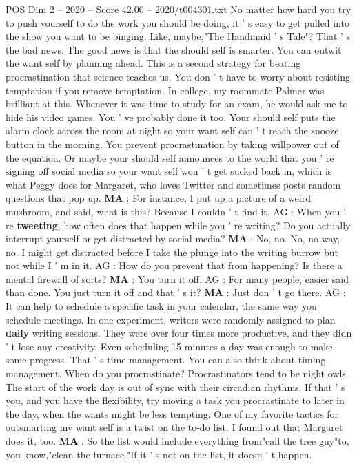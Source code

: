 \begin{textsample}{POS Dim 2 – 2020 – Score 42.00 – 2020/t004301.txt}
No matter how hard you try to push yourself to do the work you should be doing, it ' s easy to get pulled into the show you want to be binging.
Like, maybe,"The Handmaid ' s Tale"?
That ' s the bad news.
The good news is that the should self is smarter.
You can outwit the want self by planning ahead.
This is a second strategy for beating procrastination that science teaches us.
You don ' t have to worry about resisting temptation if you remove temptation.
In college, my roommate Palmer was brilliant at this.
Whenever it was time to study for an exam, he would ask me to hide his video games.
You ' ve probably done it too.
Your should self puts the alarm clock across the room at night so your want self can ' t reach the snooze button in the morning.
You prevent procrastination by taking willpower out of the equation.
Or maybe your should self announces to the world that you ' re signing off social media so your want self won ' t get sucked back in, which is what Peggy does for Margaret, who loves Twitter and sometimes posts random questions that pop up. \textbf{MA} : For instance, I put up a picture of a weird mushroom, and said, what is this?
Because I couldn ' t find it.
AG : When you ' re \textbf{tweeting}, how often does that happen while you ' re writing?
Do you actually interrupt yourself or get distracted by social media? \textbf{MA} : No, no.
No, no way, no.
I might get distracted before I take the plunge into the writing burrow but not while I ' m in it.
AG : How do you prevent that from happening?
Is there a mental firewall of sorts? \textbf{MA} : You turn it off.
AG : For many people, easier said than done.
You just turn it off and that ' s it? \textbf{MA} : Just don ' t go there.
AG : It can help to schedule a specific task in your calendar, the same way you schedule meetings.
In one experiment, writers were randomly assigned to plan \textbf{daily} writing sessions.
They were over four times more productive, and they didn ' t lose any creativity.
Even scheduling 15 minutes a day was enough to make some progress.
That ' s time management.
You can also think about timing management.
When do you procrastinate?
Procrastinators tend to be night owls.
The start of the work day is out of sync with their circadian rhythms.
If that ' s you, and you have the flexibility, try moving a task you procrastinate to later in the day, when the wants might be less tempting.
One of my favorite tactics for outsmarting my want self is a twist on the to-do list.
I found out that Margaret does it, too. \textbf{MA} : So the list would include everything from"call the tree guy"to, you know,"clean the furnace."If it ' s not on the list, it doesn ' t happen.

\end{textsample}
